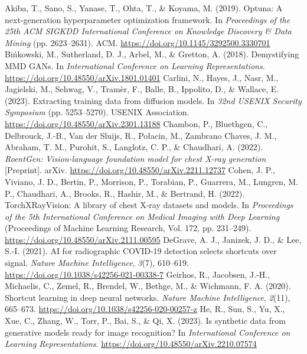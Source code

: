 \documentclass[11pt,a4paper]{article}
\begin{document}
\setlength{\bibhang}{0.5in}\setlength{\bibsep}{3pt}
\small
\renewcommand{\refname}{References}
\begin{thebibliography}{}
 Akiba, T., Sano, S., Yanase, T., Ohta, T., \& Koyama, M. (2019). Optuna: A next-generation hyperparameter optimization framework. In \textit{Proceedings of the 25th ACM SIGKDD International Conference on Knowledge Discovery \& Data Mining} (pp. 2623--2631). ACM. \url{https://doi.org/10.1145/3292500.3330701}
 Bi\'nkowski, M., Sutherland, D. J., Arbel, M., \& Gretton, A. (2018). Demystifying MMD GANs. In \textit{International Conference on Learning Representations}. \url{https://doi.org/10.48550/arXiv.1801.01401}
 Carlini, N., Hayes, J., Nasr, M., Jagielski, M., Sehwag, V., Tram\`er, F., Balle, B., Ippolito, D., \& Wallace, E. (2023). Extracting training data from diffusion models. In \textit{32nd USENIX Security Symposium} (pp. 5253--5270). USENIX Association. \url{https://doi.org/10.48550/arXiv.2301.13188}
 Chambon, P., Bluethgen, C., Delbrouck, J.-B., Van der Sluijs, R., Po\l{}acin, M., Zambrano Chaves, J. M., Abraham, T. M., Purohit, S., Langlotz, C. P., \& Chaudhari, A. (2022). \textit{RoentGen: Vision-language foundation model for chest X-ray generation} [Preprint]. arXiv. \url{https://doi.org/10.48550/arXiv.2211.12737}
 Cohen, J. P., Viviano, J. D., Bertin, P., Morrison, P., Torabian, P., Guarrera, M., Lungren, M. P., Chaudhari, A., Brooks, R., Hashir, M., \& Bertrand, H. (2022). TorchXRayVision: A library of chest X-ray datasets and models. In \textit{Proceedings of the 5th International Conference on Medical Imaging with Deep Learning} (Proceedings of Machine Learning Research, Vol. 172, pp. 231--249). \url{https://doi.org/10.48550/arXiv.2111.00595}
 DeGrave, A. J., Janizek, J. D., \& Lee, S.-I. (2021). AI for radiographic COVID-19 detection selects shortcuts over signal. \textit{Nature Machine Intelligence}, \textit{3}(7), 610--619. \url{https://doi.org/10.1038/s42256-021-00338-7}
 Geirhos, R., Jacobsen, J.-H., Michaelis, C., Zemel, R., Brendel, W., Bethge, M., \& Wichmann, F. A. (2020). Shortcut learning in deep neural networks. \textit{Nature Machine Intelligence}, \textit{2}(11), 665--673. \url{https://doi.org/10.1038/s42256-020-00257-z}
 He, R., Sun, S., Yu, X., Xue, C., Zhang, W., Torr, P., Bai, S., \& Qi, X. (2023). Is synthetic data from generative models ready for image recognition? In \textit{International Conference on Learning Representations}. \url{https://doi.org/10.48550/arXiv.2210.07574}

\end{thebibliography}
\end{document}
